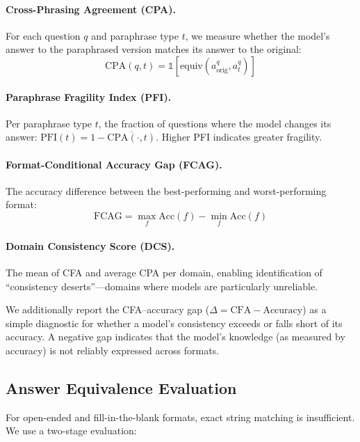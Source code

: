 \documentclass{article}
\newcommand{\cfa}{\text{CFA}}
\newcommand{\cpa}{\text{CPA}}
\newcommand{\pfi}{\text{PFI}}
\newcommand{\fcag}{\text{FCAG}}
\begin{document}
\paragraph{Cross-Phrasing Agreement (CPA).} For each question $q$ and paraphrase type $t$, we measure whether the model's answer to the paraphrased version matches its answer to the original:
\begin{equation}
    \cpa(q, t) = \mathbb{1}[\text{equiv}(a_{\text{orig}}^q, a_t^q)]
\end{equation}

\paragraph{Paraphrase Fragility Index (PFI).} Per paraphrase type $t$, the fraction of questions where the model changes its answer: $\pfi(t) = 1 - \overline{\cpa(\cdot, t)}$. Higher PFI indicates greater fragility.

\paragraph{Format-Conditional Accuracy Gap (FCAG).} The accuracy difference between the best-performing and worst-performing format:
\begin{equation}
    \fcag = \max_f \text{Acc}(f) - \min_f \text{Acc}(f)
\end{equation}

\paragraph{Domain Consistency Score (DCS).} The mean of CFA and average CPA per domain, enabling identification of ``consistency deserts''---domains where models are particularly unreliable.

We additionally report the CFA--accuracy gap ($\Delta = \cfa - \text{Accuracy}$) as a simple diagnostic for whether a model's consistency exceeds or falls short of its accuracy. A negative gap indicates that the model's knowledge (as measured by accuracy) is not reliably expressed across formats.

\subsection{Answer Equivalence Evaluation}
\label{sec:judge}

For open-ended and fill-in-the-blank formats, exact string matching is insufficient. We use a two-stage evaluation:
\end{document}
